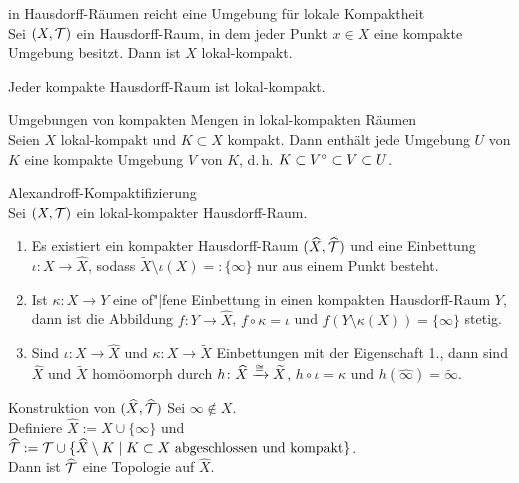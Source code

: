 \begin{Satz}{in Hausdorff-Räumen reicht eine Umgebung für lokale Kompaktheit}\\
    Sei $(X, \mathcal{T})$ ein Hausdorff-Raum, in dem jeder Punkt $x \in X$ eine
    kompakte Umgebung besitzt.
    Dann ist $X$ lokal-kompakt.
\end{Satz}

\begin{Kor}
    Jeder kompakte Hausdorff-Raum ist lokal-kompakt.
\end{Kor}

\begin{Satz}{Umgebungen von kompakten Mengen in lokal-kompakten Räumen}\\
    Seien $X$ lokal-kompakt und $K \subset X$ kompakt.
    Dann enthält jede Umgebung $U$ von $K$ eine kompakte Umgebung $V$ von $K$,
    d.\,h. $K \subset {V}^\circ \subset V \subset U$.
\end{Satz}

\linie

\begin{Satz}{Alexandroff-Kompaktifizierung}\\
    Sei $(X, \mathcal{T})$ ein lokal-kompakter Hausdorff-Raum.
    \begin{enumerate}
        \item
        Es existiert ein kompakter Hausdorff-Raum $(\widehat{X}, \widehat{\mathcal{T}})$
        und eine Einbettung $\iota\colon X \rightarrow \widehat{X}$, sodass
        $\widetilde{X} \setminus \iota(X) =: \{\infty\}$ nur aus einem
        Punkt besteht.
        
        \item
        Ist $\kappa\colon X \rightarrow Y$ eine of"|fene Einbettung in einen
        kompakten Hausdorff-Raum $Y$, dann ist die Abbildung
        $f\colon Y \rightarrow \widehat{X}$, $f \circ \kappa = \iota$ und
        $f(Y \setminus \kappa(X)) = \{\infty\}$ stetig.
        
        \item
        Sind $\iota\colon X \rightarrow \widehat{X}$ und
        $\kappa\colon X \rightarrow \widetilde{X}$ Einbettungen mit der
        Eigenschaft 1., dann sind $\widehat{X}$ und $\widetilde{X}$ homöomorph
        durch $h\colon \widehat{X} \xrightarrow{\cong} \widetilde{X}$,
        $h \circ \iota = \kappa$ und
        $h(\widehat{\infty}) = \widetilde{\infty}$.
    \end{enumerate}
\end{Satz}

\begin{Lemma}{Konstruktion von $(\widehat{X}, \widehat{\mathcal{T}})$}
    Sei $\infty \notin X$. \\
    Definiere $\widehat{X} := X \cup \{\infty\}$ und
    $\widehat{\mathcal{T}} := \mathcal{T} \cup \{\widehat{X} \setminus K \;|\;
    K \subset X \text{ abgeschlossen und kompakt}\}$. \\
    Dann ist $\widehat{\mathcal{T}}$ eine Topologie auf $\widehat{X}$.
\end{Lemma}

